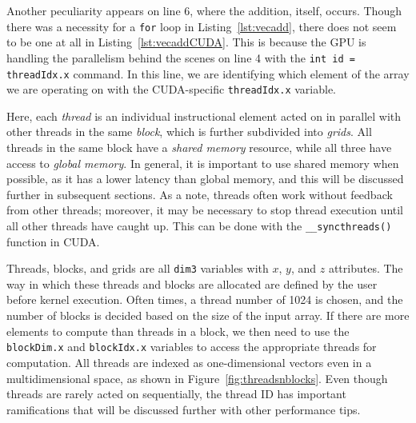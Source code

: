 Another peculiarity appears on line 6, where the addition, itself, occurs.
Though there was a necessity for a \texttt{for} loop in Listing~\ref{lst:vecadd}, there does not seem to be one at all in Listing~\ref{lst:vecaddCUDA}.
This is because the GPU is handling the parallelism behind the scenes on line 4 with the \texttt{int id = threadIdx.x} command.
In this line, we are identifying which element of the array we are operating on with the CUDA-specific \texttt{threadIdx.x} variable.

Here, each \textit{thread} is an individual instructional element acted on in parallel with other threads in the same \textit{block}, which is further subdivided into \textit{grids}.
All threads in the same block have a \textit{shared memory} resource, while all three have access to \textit{global memory}.
In general, it is important to use shared memory when possible, as it has a lower latency than global memory, and this will be discussed further in subsequent sections.
As a note, threads often work without feedback from other threads; moreover, it may be necessary to stop thread execution until all other threads have caught up.
This can be done with the \texttt{\_\_syncthreads()} function in CUDA.

Threads, blocks, and grids are all \texttt{dim3} variables with $x$, $y$, and $z$ attributes.
The way in which these threads and blocks are allocated are defined by the user before kernel execution.
Often times, a thread number of 1024 is chosen, and the number of blocks is decided based on the size of the input array.
If there are more elements to compute than threads in a block, we then need to use the \texttt{blockDim.x} and \texttt{blockIdx.x} variables to access the appropriate threads for computation.
All threads are indexed as one-dimensional vectors even in a multidimensional space, as shown in Figure~\ref{fig:threadsnblocks}.
Even though threads are rarely acted on sequentially, the thread ID has important ramifications that will be discussed further with other performance tips.

